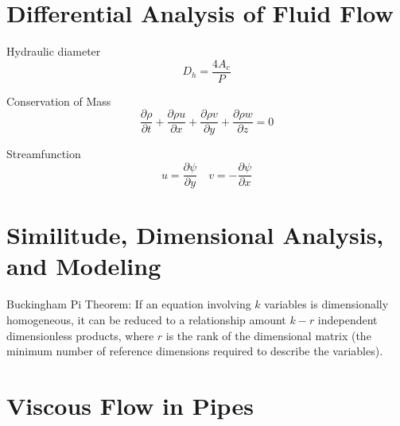 \documentclass{article}
\begin{document}
%
%
\newpage
\section{Differential Analysis of Fluid Flow}

Hydraulic diameter
\begin{equation}
  D_h = \frac{4A_c}{P}
\end{equation}

Conservation of Mass
\begin{equation}
  \frac{\partial\rho}{\partial t} + \frac{\partial\rho u}{\partial x} +\frac{\partial\rho v}{\partial y} +\frac{\partial\rho w}{\partial z} = 0
\end{equation}

Streamfunction
\begin{equation}
  u=\frac{\partial\psi}{\partial y}\quad v=-\frac{\partial\psi}{\partial x}
\end{equation}

%
%
\newpage
\section{Similitude, Dimensional Analysis, and Modeling}

Buckingham Pi Theorem: If an equation involving $k$ variables is dimensionally homogeneous, it can be reduced to a relationship amount $k - r$ independent dimensionless products, where $r$ is the rank of the dimensional matrix (the minimum number of reference dimensions required to describe the variables).


%
%
\newpage
\section{Viscous Flow in Pipes}
\end{document}

